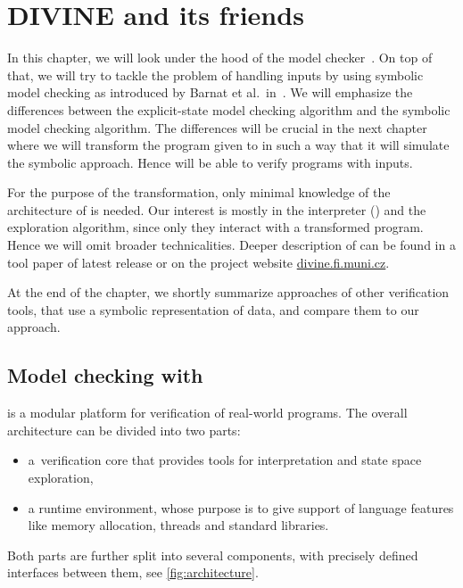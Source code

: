 \chapter{DIVINE and its friends}\label{ch:divine}

In this chapter, we will look under the hood of the \DIVINE model
checker~\cite{Divine17}.  On top of that, we will try to tackle the problem of
handling inputs by using symbolic model checking as introduced by Barnat et
al.~in~\cite{Barnat14}. We will emphasize the differences between the
explicit-state model checking algorithm and the symbolic model checking algorithm.
The differences will be crucial in the next chapter where we will transform the
program given to \DIVINE in such a way that it will simulate the symbolic approach.
Hence \DIVINE will be able to verify programs with inputs.

For the purpose of the transformation, only minimal knowledge of the architecture of
\DIVINE is needed. Our interest is mostly in the \LLVM interpreter (\DIVM) and
the exploration algorithm, since only they interact with a transformed program.
Hence we will omit broader technicalities. Deeper description of \DIVINE can be
found in a tool paper of latest release \cite{Divine17} or on the project website
\href{https://divine.fi.muni.cz/}{divine.fi.muni.cz}.

At the end of the chapter, we shortly summarize approaches of other verification
tools, that use a symbolic representation of data, and compare them to our approach.

\section{Model checking with \DIVINE}

\DIVINE is a
modular platform for verification of real-world programs. The overall
architecture
can be divided into two parts:
\begin{itemize}
    \item a~verification core that provides tools for \LLVM interpretation and
        state space exploration,
    \item a runtime environment, whose purpose is to give support of
        language features like memory allocation, threads and standard
        libraries.
\end{itemize}
Both parts are further split into several components,
with precisely defined interfaces between them, see \autoref{fig:architecture}.

